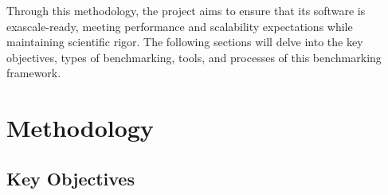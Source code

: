 Through this methodology, the \exama project aims to ensure that its software is exascale-ready, meeting performance and scalability expectations while maintaining scientific rigor. The following sections will delve into the key objectives, types of benchmarking, tools, and processes of this benchmarking framework.

\section{Methodology}
\label{sec:bench:methodology}


\subsection{Key Objectives}
\label{sec:key-objectives}

